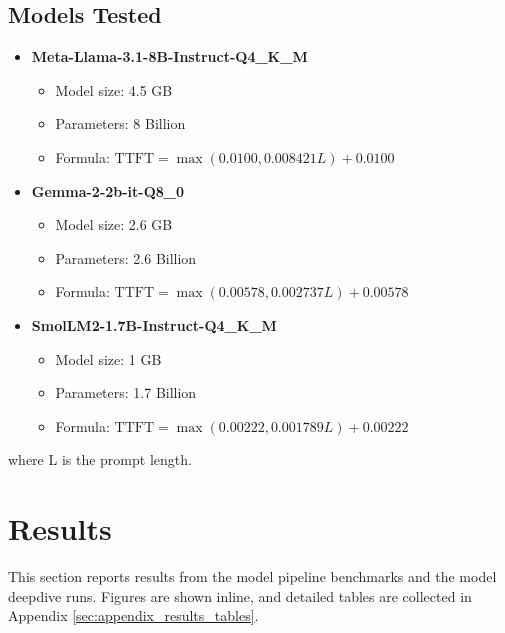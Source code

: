 \documentclass[11pt,a4paper]{article}
\begin{document}
\subsection{Models Tested}
\label{sec:models}
\begin{itemize}
    \item \textbf{Meta-Llama-3.1-8B-Instruct-Q4\_K\_M}
    \begin{itemize}
        \item Model size: 4.5 GB
        \item Parameters: 8 Billion
        \item Formula: $\text{TTFT} = \max(0.0100, 0.008421L) + 0.0100$
    \end{itemize}
    \item \textbf{Gemma-2-2b-it-Q8\_0}
    \begin{itemize}
        \item Model size: 2.6 GB
        \item Parameters: 2.6 Billion
        \item Formula: $\text{TTFT} = \max(0.00578, 0.002737L) + 0.00578$
    \end{itemize}
    \item \textbf{SmolLM2-1.7B-Instruct-Q4\_K\_M}
    \begin{itemize}
        \item Model size: 1 GB
        \item Parameters: 1.7 Billion
        \item Formula: $\text{TTFT} = \max(0.00222, 0.001789L) + 0.00222$
    \end{itemize}
\end{itemize}
where L is the prompt length.

\section{Results}
This section reports results from the model pipeline benchmarks and the model deepdive runs. Figures are shown inline, and detailed tables are collected in Appendix \ref{sec:appendix_results_tables}.
\end{document}
